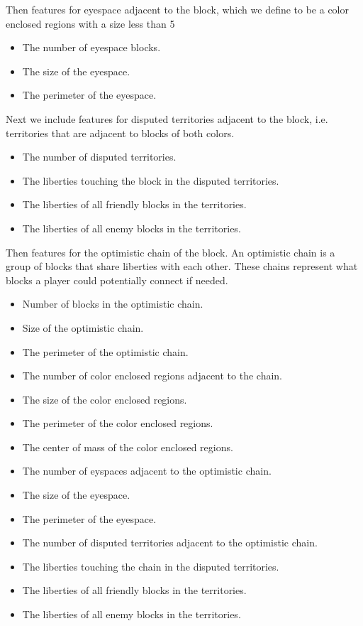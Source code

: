 \documentclass[11pt,letterpaper]{article}
\begin{document}
Then features for eyespace adjacent to the block, which we define to be a color enclosed regions with a size less than 5
\begin{itemize}
  \item The number of eyespace blocks.
  \item The size of the eyespace.
  \item The perimeter of the eyespace.
\end{itemize}
Next we include features for disputed territories adjacent to the block, i.e. territories that are adjacent to blocks of both colors.
\begin{itemize}
  \item The number of disputed territories.
  \item The liberties touching the block in the disputed territories.
  \item The liberties of all friendly blocks in the territories.
  \item The liberties of all enemy blocks in the territories.
\end{itemize}
Then features for the optimistic chain of the block. An optimistic chain is a group of blocks that share liberties with each other.
These chains represent what blocks a player could potentially connect if needed.
\begin{itemize}
  \item Number of blocks in the optimistic chain.
  \item Size of the optimistic chain.
  \item The perimeter of the optimistic chain.
  \item The number of color enclosed regions adjacent to the chain.
  \item The size of the color enclosed regions.
  \item The perimeter of the color enclosed regions.
  \item The center of mass of the color enclosed regions.
  \item The number of eyspaces adjacent to the optimistic chain.
  \item The size of the eyespace.
  \item The perimeter of the eyespace.
  \item The number of disputed territories adjacent to the optimistic chain.
  \item The liberties touching the chain in the disputed territories.
  \item The liberties of all friendly blocks in the territories.
  \item The liberties of all enemy blocks in the territories.
\end{itemize}
\end{document}
